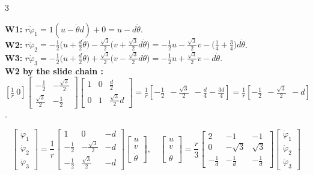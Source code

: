 \begin{multicols}{3}
\begin{deriv}[Step 2: each wheel's row from $r\dot\varphi_i=\cos\beta_i(u-\dot\theta\wXy i)+\sin\beta_i(v+\dot\theta\wXx i)$ \added]
\textbf{W1:} $r\dot\varphi_1=1(u-\dot\theta d)+0=u-d\dot\theta$.\\
\textbf{W2:} $r\dot\varphi_2=-\tfrac12\big(u+\tfrac d2\dot\theta\big)-\tfrac{\sqrt3}2\big(v+\tfrac{\sqrt3}2d\dot\theta\big)=-\tfrac12u-\tfrac{\sqrt3}2v-\big(\tfrac14+\tfrac34\big)d\dot\theta$.\\
\textbf{W3:} $r\dot\varphi_3=-\tfrac12\big(u+\tfrac d2\dot\theta\big)+\tfrac{\sqrt3}2\big(v-\tfrac{\sqrt3}2d\dot\theta\big)=-\tfrac12u+\tfrac{\sqrt3}2v-d\dot\theta$.\\
\textbf{W2 by the slide chain :} $[\tfrac1r\ 0]\begin{bmatrix}-\frac12&-\frac{\sqrt3}2\\\frac{\sqrt3}2&-\frac12\end{bmatrix}\begin{bmatrix}1&0&\frac d2\\0&1&\frac{\sqrt3}2d\end{bmatrix}=\frac1r[-\tfrac12\ \ -\tfrac{\sqrt3}2\ \ -\tfrac d4-\tfrac{3d}4]=\frac1r[-\tfrac12\ \ -\tfrac{\sqrt3}2\ \ -d]$.
\end{deriv}
\begin{fbx}
\[\begin{bmatrix}\dot\varphi_1\\\dot\varphi_2\\\dot\varphi_3\end{bmatrix}=\frac1r\begin{bmatrix}1&0&-d\\-\frac12&-\frac{\sqrt3}2&-d\\-\frac12&\frac{\sqrt3}2&-d\end{bmatrix}\begin{bmatrix}u\\v\\\dot\theta\end{bmatrix},\quad
\begin{bmatrix}u\\v\\\dot\theta\end{bmatrix}=\frac r3\begin{bmatrix}2&-1&-1\\0&-\sqrt3&\sqrt3\\-\frac1d&-\frac1d&-\frac1d\end{bmatrix}\begin{bmatrix}\dot\varphi_1\\\dot\varphi_2\\\dot\varphi_3\end{bmatrix}\]

\end{fbx}
\end{multicols}
